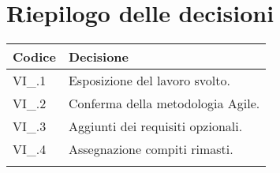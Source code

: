 \newpage

\section{Riepilogo delle decisioni \hfil}
{
	\setlength{\freewidth}{\dimexpr\textwidth-4\tabcolsep}
	\renewcommand{\arraystretch}{1.5}
	\setlength{\aboverulesep}{0pt}
	\setlength{\belowrulesep}{0pt}
	\begin{longtable}{L{.3\freewidth} L{.7\freewidth}}
		\toprule 
		\textbf{Codice} & \textbf{Decisione}\\
		\toprule
		\endhead
		
		VI\_\DataMeeting{}.1 & Esposizione del lavoro svolto. \\  
		VI\_\DataMeeting{}.2 & Conferma della metodologia Agile. \\
		VI\_\DataMeeting{}.3 & Aggiunti dei requisiti opzionali. \\ 
		VI\_\DataMeeting{}.4 & Assegnazione compiti rimasti. \\
		
		\bottomrule
		\hiderowcolors
	\end{longtable}
}